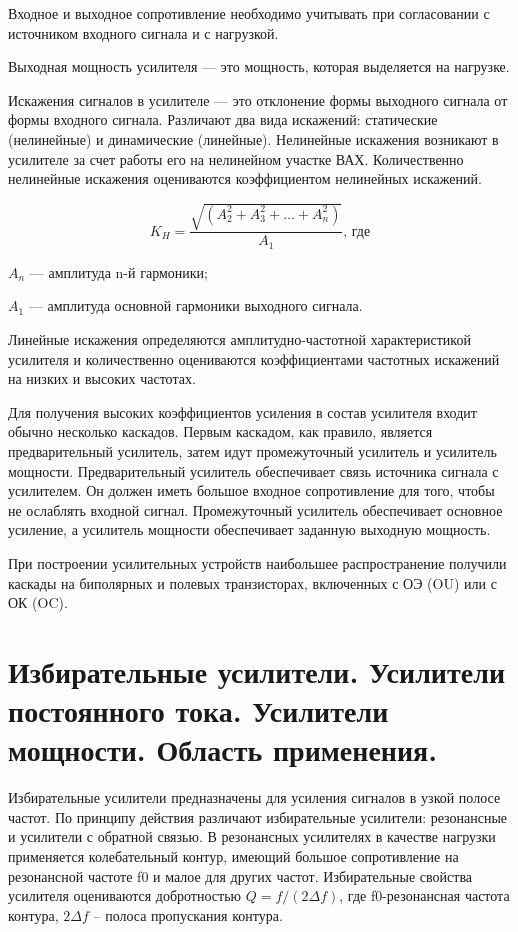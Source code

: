 Входное и выходное сопротивление необходимо учитывать при согласовании с источником входного сигнала и с нагрузкой. 

Выходная мощность усилителя --- это мощность, которая выделяется на нагрузке.

Искажения сигналов в усилителе --- это отклонение формы выходного сигнала от формы входного сигнала. Различают два вида искажений: статические (нелинейные) и динамические (линейные). Нелинейные искажения возникают в усилителе за счет работы его на нелинейном участке ВАХ. Количественно нелинейные искажения оцениваются коэффициентом нелинейных искажений.

\begin{equation}
K_{H} = \dfrac{\sqrt{(A_{2}^{2} + A_{3}^{2} + \ldots + A_{n}^{2})} }{A_{1}}\text{, где}
\end{equation}
\par $A_{n}$ --- амплитуда n-й гармоники;
\par $A_{1}$ --- амплитуда основной гармоники выходного сигнала.

Линейные искажения определяются амплитудно-частотной характеристикой усилителя и количественно оцениваются коэффициентами частотных искажений на низких и высоких частотах.

Для получения высоких коэффициентов усиления в состав усилителя входит обычно несколько каскадов. Первым каскадом, как правило, является предварительный усилитель, затем идут промежуточный усилитель и усилитель мощности. Предварительный усилитель обеспечивает связь источника сигнала с усилителем. Он должен иметь большое входное сопротивление для того, чтобы не ослаблять входной сигнал. Промежуточный усилитель обеспечивает основное усиление, а усилитель мощности обеспечивает заданную выходную мощность.

При построении усилительных устройств наибольшее распространение получили каскады на биполярных и полевых транзисторах, включенных с ОЭ (OU) или с ОК (OC).

\section{Избирательные усилители. Усилители постоянного тока. Усилители мощности. Область применения.}

Избирательные усилители предназначены для усиления сигналов в узкой полосе частот. По принципу действия различают избирательные усилители: резонансные и усилители с обратной связью.
В резонансных усилителях в качестве нагрузки применяется колебательный контур, имеющий большое сопротивление на резонансной частоте f0 и малое для других частот. Избирательные свойства усилителя оцениваются добротностью $Q=f/(2\Delta f)$, где f0-резонансная частота контура, $2\Delta f$ – полоса пропускания контура.



